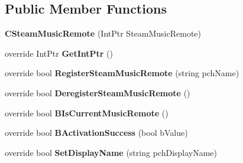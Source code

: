 \subsection*{Public Member Functions}
\begin{DoxyCompactItemize}
\item 
\hypertarget{classValve_1_1Steamworks_1_1CSteamMusicRemote_a607b951b9e380bf98ea6c96a877453fd}{}{\bfseries C\+Steam\+Music\+Remote} (Int\+Ptr Steam\+Music\+Remote)\label{classValve_1_1Steamworks_1_1CSteamMusicRemote_a607b951b9e380bf98ea6c96a877453fd}

\item 
\hypertarget{classValve_1_1Steamworks_1_1CSteamMusicRemote_aedc90e4e36845e9566f5efca31c1b6a0}{}override Int\+Ptr {\bfseries Get\+Int\+Ptr} ()\label{classValve_1_1Steamworks_1_1CSteamMusicRemote_aedc90e4e36845e9566f5efca31c1b6a0}

\item 
\hypertarget{classValve_1_1Steamworks_1_1CSteamMusicRemote_a6cd1f99e14bbd85ece7132788ae81dc5}{}override bool {\bfseries Register\+Steam\+Music\+Remote} (string pch\+Name)\label{classValve_1_1Steamworks_1_1CSteamMusicRemote_a6cd1f99e14bbd85ece7132788ae81dc5}

\item 
\hypertarget{classValve_1_1Steamworks_1_1CSteamMusicRemote_a8bcd3dc4e33f1b7f8d24f2ac04bff3b7}{}override bool {\bfseries Deregister\+Steam\+Music\+Remote} ()\label{classValve_1_1Steamworks_1_1CSteamMusicRemote_a8bcd3dc4e33f1b7f8d24f2ac04bff3b7}

\item 
\hypertarget{classValve_1_1Steamworks_1_1CSteamMusicRemote_a2a5bf5514aa296609314fcd99088b727}{}override bool {\bfseries B\+Is\+Current\+Music\+Remote} ()\label{classValve_1_1Steamworks_1_1CSteamMusicRemote_a2a5bf5514aa296609314fcd99088b727}

\item 
\hypertarget{classValve_1_1Steamworks_1_1CSteamMusicRemote_a3038e038e71badefadb7db11d40a57d5}{}override bool {\bfseries B\+Activation\+Success} (bool b\+Value)\label{classValve_1_1Steamworks_1_1CSteamMusicRemote_a3038e038e71badefadb7db11d40a57d5}

\item 
\hypertarget{classValve_1_1Steamworks_1_1CSteamMusicRemote_a5b3be3ac3efffd80b03e90cfd4011d6a}{}override bool {\bfseries Set\+Display\+Name} (string pch\+Display\+Name)\label{classValve_1_1Steamworks_1_1CSteamMusicRemote_a5b3be3ac3efffd80b03e90cfd4011d6a}


\end{DoxyCompactItemize}
